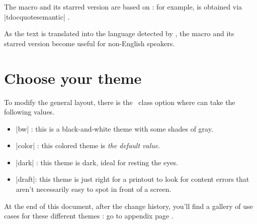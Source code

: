 The macro  and its starred version are based on  : for example,  is obtained via \tdocinlatex|tdocquote{semantic}| .


\begin{tdocnote}
    As the text  is translated into the language detected by \thisproj, the macro  and its starred version become useful for non-English speakers.
\end{tdocnote}


\section{Choose your theme}

To modify the general layout, there is the \thisproj\ class option  where  can take the following values.

\begin{itemize}
    \item \tdocinlatex|bw| :
    this is a black-and-white theme with some shades of gray.

    \item \tdocinlatex|color| :
    this colored theme is \emph{the default value}.

    \item \tdocinlatex|dark| :
    this theme is dark, ideal for resting the eyes.

    \item \tdocinlatex|draft|:
    this theme is just right for a printout to look for content errors that aren't necessarily easy to spot in front of a screen.
\end{itemize}


\begin{tdocnote}
    At the end of this document, after the change history, you'll find a gallery of use cases for these different themes : go to appendix page \pageref{tutodoc-theme-gallery}.
\end{tdocnote}




